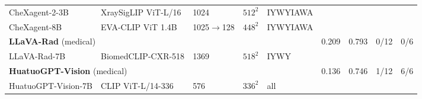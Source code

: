 \begin{table}[pos=tp]
{\begin{tabular}{lllll@{\hspace{8pt}}rrrr}
\quad CheXagent-2-3B & XraySigLIP ViT-L/16 & 1024 & $512^2$ & IYWYIAWA & & & & \\
\quad CheXagent-8B & EVA-CLIP ViT 1.4B & 1025$\to$128 & $448^2$ & IYWYIAWA & & & & \\
\midrule
\multicolumn{5}{l}{\textbf{LLaVA-Rad} (medical)\cite{zambranochaves2025llavarad}} & 0.209 & 0.793 & \cellcolor{cfTerra1}0/12 & \cellcolor{cfTerra1}0/6 \\
\quad LLaVA-Rad-7B & BiomedCLIP-CXR-518 & 1369 & $518^2$ & IYWY & & & & \\
\midrule
\multicolumn{5}{l}{\textbf{HuatuoGPT-Vision} (medical)\cite{chen2024huatuogptvision}} & 0.136 & 0.746 & \cellcolor{cfTerra2}1/12 & \cellcolor{cfTerra4}6/6 \\
\quad HuatuoGPT-Vision-7B & CLIP ViT-L/14-336 & 576 & $336^2$ & all & & & & \\
\bottomrule
\end{tabular}}
\end{table}
